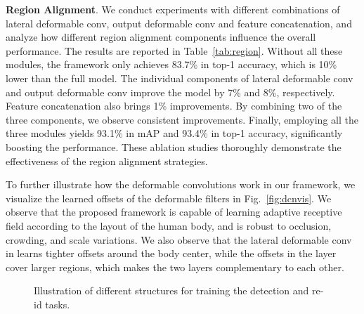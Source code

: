 \documentclass[final]{cvpr}
\begin{document}
\textbf{Region Alignment}. 
We conduct experiments with different combinations of lateral deformable conv, output deformable conv and feature concatenation, and analyze how different region alignment components influence the overall performance. The results are reported in Table~\ref{tab:region}. Without all these modules, the framework only achieves 83.7\% in top-1 accuracy, which is 10\% lower than the full model. The individual components of lateral deformable conv and output deformable conv improve the model by 7\% and 8\%, respectively. Feature concatenation also brings 1\% improvements. By combining two of the three components, we observe consistent improvements. Finally, employing all the three modules yields 93.1\% in mAP and 93.4\% in top-1 accuracy, significantly boosting the performance. These ablation studies thoroughly demonstrate the effectiveness of the region alignment strategies.

To further illustrate how the deformable convolutions work in our framework, we visualize the learned offsets of the deformable filters in Fig.~\ref{fig:dcnvis}. We observe that the proposed framework is capable of learning adaptive receptive field according to the layout of the human body, and is robust to occlusion, crowding, and scale variations. We also observe that the lateral deformable conv in  learns tighter offsets around the body center, while the offsets in the  layer cover larger regions, which makes the two layers complementary to each other.

\begin{figure}[]
\vspace{-4mm}
\setlength{\abovecaptionskip}{1mm}
\centering
{}
 \hfill
{}
 \hfill
 \vspace{-4mm}
 \hfill
{}
 \caption{Illustration of different structures for training the detection and re-id tasks.}
 \label{fig:tasks}
\end{figure}
\end{document}
